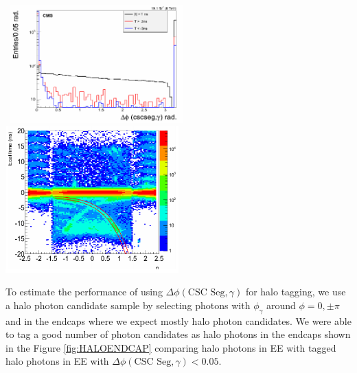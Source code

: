 \vspace{5mm}
\begin{minipage}{0.90\linewidth}  
\begin{center}
\mbox{
\includegraphics[height=0.45\textwidth, width=0.5\textwidth]{THESISPLOTS/CSC-Segment-Halo-Tagging.png}
\includegraphics[height=0.45\textwidth, width=0.5\textwidth]{THESISPLOTS/HALO-ECAL-TIME-Vs-ETA.png}}
\label{fig:HALO}
\end{center}
\end{minipage}

\vspace{5mm}
To estimate the performance of using $\Delta\phi(\mbox{CSC Seg},\gamma)$ for halo tagging, we use a halo photon candidate sample by selecting photons with $\phi_{\gamma}$ around $\phi = 0, \pm \pi$ and in the endcaps where we expect mostly halo photon candidates.  We were able to tag a good number of photon candidates as halo photons in the endcaps shown in the Figure \ref{fig:HALOENDCAP} comparing halo photons in EE with tagged halo photons in EE  with $\Delta\phi(\mbox{CSC Seg},\gamma) < 0.05$.
 
